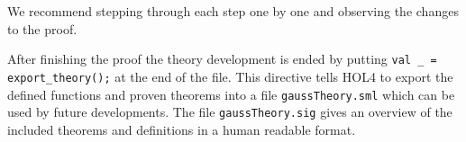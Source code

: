 We recommend stepping through each step one by one and observing the changes to
the proof.

After finishing the proof the theory development is ended by putting
\lstinline{val _ = export_theory();} at the end of the file.
This directive tells HOL4 to export the defined functions and proven theorems
into a file \texttt{gaussTheory.sml} which can be used by future developments.
The file \texttt{gaussTheory.sig} gives an overview of the included theorems and
definitions in a human readable format.
